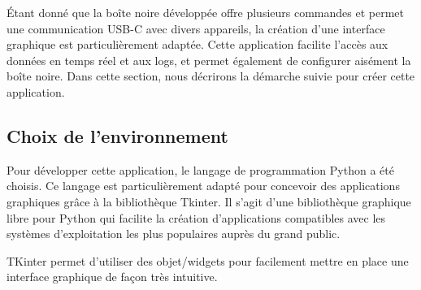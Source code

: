 Étant donné que la boîte noire développée offre plusieurs commandes et permet une communication USB-C avec divers appareils, la création d'une interface graphique est particulièrement adaptée. Cette application facilite l'accès aux données en temps réel et aux logs, et permet également de configurer aisément la boîte noire. Dans cette section, nous décrirons la démarche suivie pour créer cette application.

\subsection{Choix de l'environnement}

Pour développer cette application, le langage de programmation Python a été choisis. Ce langage est particulièrement adapté pour concevoir des applications graphiques grâce à la bibliothèque Tkinter. Il s'agit d'une bibliothèque graphique libre pour Python qui facilite la création d'applications compatibles avec les systèmes d'exploitation les plus populaires auprès du grand public.

TKinter permet d’utiliser des objet/widgets pour facilement mettre en place une interface graphique de façon très intuitive.






